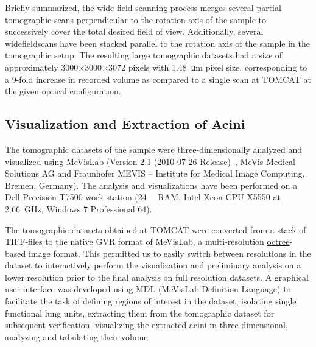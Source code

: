 \documentclass[%
	draft,
	paper=a4,%
	abstract=true,%
	]{scrartcl}
\begin{document}
Briefly summarized, the wide field scanning process merges several partial tomographic scans perpendicular to the rotation axis of the sample to successively cover the total desired field of view. Additionally, several widefieldscans have been stacked parallel to the rotation axis of the sample in the tomographic setup. The resulting large tomographic datasets had a size of approximately 3000\(\times\)3000\(\times\)3072 pixels with \SI{1.48}{\micro\meter} pixel size, corresponding to a 9-fold increase in recorded volume as compared to a single scan at TOMCAT at the given optical configuration.

\subsection{Visualization and Extraction of Acini}
The tomographic datasets of the sample were three-dimensionally analyzed and visualized using \href{http://mevislab.de}{MeVisLab} (Version 2.1 (2010-07-26 Release)~\cite{Bitter2007}, MeVis Medical Solutions AG and Fraunhofer MEVIS -- Institute for Medical Image Computing, Bremen, Germany). The analysis and visualizations have been performed on a Dell Precision T7500 work station (\SI{24}{\giga\byte} RAM, Intel Xeon CPU X5550 at \SI{2.66}{\giga\hertz}, Windows 7 Professional \SI{64}{\bit}). 

The tomographic datasets obtained at TOMCAT were converted from a stack of TIFF-files to the native GVR format of MeVisLab, a multi-resolution \href{https://secure.wikimedia.org/wikipedia/en/w/index.php?title=Octree&oldid=409131920}{octree}-based image format. This permitted us to easily switch between resolutions in the dataset to interactively perform the visualization and preliminary analysis on a lower resolution prior to the final analysis on full resolution datasets. A graphical user interface was developed using MDL (MeVisLab Definition Language) to facilitate the task of defining regions of interest in the dataset, isolating single functional lung units, extracting them from the tomographic dataset for subsequent verification, visualizing the extracted acini in three-dimensional, analyzing and tabulating their volume.
\end{document}
